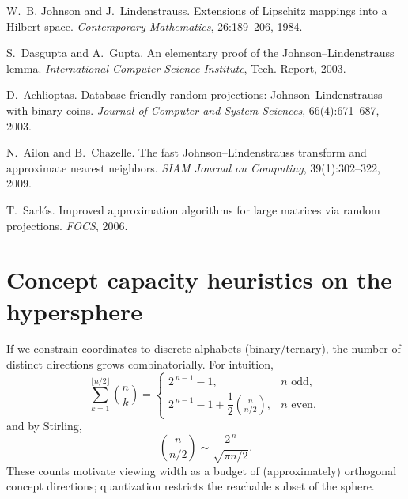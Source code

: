 \documentclass{article}
\begin{document}
\small

\begin{thebibliography}{9}

W.~B. Johnson and J.~Lindenstrauss.
\newblock Extensions of Lipschitz mappings into a Hilbert space.
\newblock \emph{Contemporary Mathematics}, 26:189--206, 1984.

S.~Dasgupta and A.~Gupta.
\newblock An elementary proof of the Johnson--Lindenstrauss lemma.
\newblock \emph{International Computer Science Institute}, Tech. Report, 2003.

D.~Achlioptas.
\newblock Database-friendly random projections: Johnson--Lindenstrauss with binary coins.
\newblock \emph{Journal of Computer and System Sciences}, 66(4):671--687, 2003.

N.~Ailon and B.~Chazelle.
\newblock The fast Johnson--Lindenstrauss transform and approximate nearest neighbors.
\newblock \emph{SIAM Journal on Computing}, 39(1):302--322, 2009.

T.~Sarl{\'o}s.
\newblock Improved approximation algorithms for large matrices via random projections.
\newblock \emph{FOCS}, 2006.

\end{thebibliography}

\normalsize
\appendix
\section{Concept capacity heuristics on the hypersphere}
If we constrain coordinates to discrete alphabets (binary/ternary), the number of
distinct directions grows combinatorially. For intuition,
\begin{equation}
\sum_{k=1}^{\lfloor n/2 \rfloor} \binom{n}{k}
=
\begin{cases}
2^{\,n-1}-1, & \text{$n$ odd},\\[4pt]
2^{\,n-1}-1 + \dfrac{1}{2}\binom{n}{n/2}, & \text{$n$ even},
\end{cases}
\end{equation}
and by Stirling,
\begin{equation}
\binom{n}{n/2}\sim \frac{2^{\,n}}{\sqrt{\pi n/2}}.
\end{equation}
These counts motivate viewing width as a budget of (approximately) orthogonal
concept directions; quantization restricts the reachable subset of the sphere.
\end{document}
